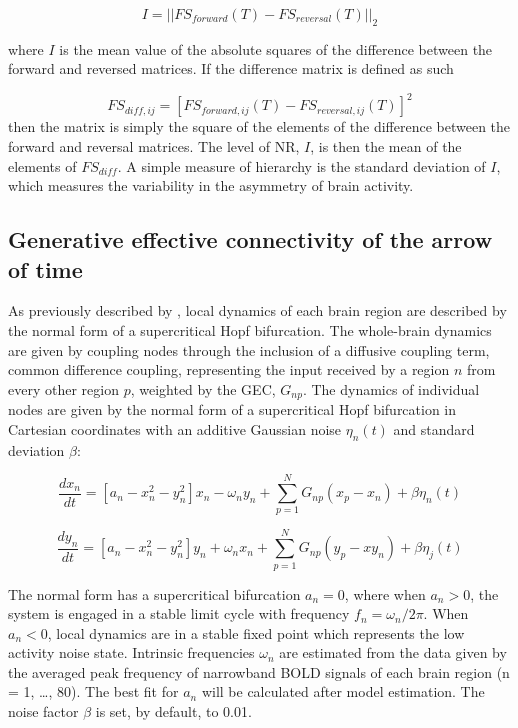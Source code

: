 \begin{equation}
I=||FS_{forward}(T) - FS_{reversal}(T)||_2
\end{equation}


where \(I\) is the mean value of the absolute squares of the difference
between the forward and reversed matrices. If the difference matrix is
defined as such


\begin{equation}
FS_{diff,ij} = [FS_{forward,ij}(T) - FS_{reversal,ij}(T)]^2
\end{equation}
then the matrix is simply the square of the elements of the
difference between the forward and reversal matrices. The level of NR,
\(I\), is then the mean of the elements of \(FS_{diff}\). A simple
measure of hierarchy is the standard deviation of \(I\), which measures
the variability in the asymmetry of brain activity. 

\subsection{Generative effective connectivity of the arrow of time}
As previously described by \textcite{Kringelbach2023}, local dynamics of each brain region are described by
the normal form of a supercritical Hopf bifurcation. The whole-brain dynamics are given by coupling nodes through the
inclusion of a diffusive coupling term, common difference coupling,
representing the input received by a region \(n\) from every other
region \(p\), weighted by the GEC, \(G_{np}\). The dynamics of
individual nodes are given by the normal form of a supercritical Hopf
bifurcation in Cartesian coordinates with an additive Gaussian noise
\(\eta_n(t)\) and standard deviation \(\beta\):


\begin{equation}
\frac{dx_n}{dt} = [a_n - x^2_n - y^2_n]x_n - \omega_ny_n+\sum_{p=1}^N{G_{np}(x_p-x_n)} + \beta\eta_n(t)
\end{equation}

\begin{equation}
\frac{dy_n}{dt} = [a_n - x^2_n - y^2_n]y_n + \omega_nx_n+\sum_{p=1}^N{G_{np}(y_p-xy_n)} + \beta\eta_j(t)
\end{equation}


The normal form has a supercritical bifurcation \(a_n=0\), where when
\(a_n>0\), the system is engaged in a stable limit cycle with frequency
\(f_n = \omega_n/2\pi\). When \(a_n<0\), local dynamics are in a stable
fixed point which represents the low activity noise state. Intrinsic
frequencies \(\omega_n\) are estimated from the data given by the
averaged peak frequency of narrowband BOLD signals of each brain region
(n = 1, \ldots, 80). The best fit for \(a_n\) will be calculated after
model estimation. The noise factor \(\beta\) is set, by default, to
0.01.

